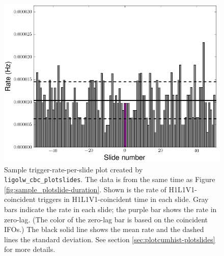 \begin{figure}[p]
\label{fig:sample_plotslide-rate}
\center
\includegraphics[width=5in]{figures/H1L1V1-ligolw_cbc_plotslides_FULL_DATA_CAT_4_VETO_H1L1V1_rates_ALL_DATA_PLOTTED_OPEN_BOX-931035296-4763191.png}
\caption{Sample trigger-rate-per-slide plot created by
\texttt{ligolw\_cbc\_plotslides}. The data is from the same time as Figure
\ref{fig:sample_plotslide-duration}. Shown is the rate of H1L1V1-coincident
triggers in H1L1V1-coincident time in each slide. Gray bars indicate the rate
in each slide; the purple bar shows the rate in zero-lag. (The color of the
zero-lag bar is based on the coincident \acp{IFO}.) The black solid line shows
the mean rate and the dashed lines the standard deviation.  See section
\ref{sec:plotcumhist-plotslides} for more details.}
\end{figure}

